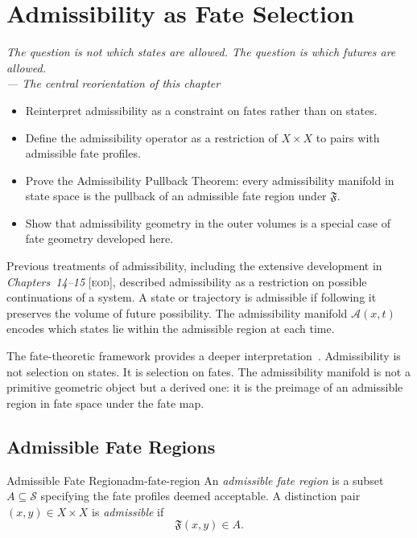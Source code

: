 \documentclass[12pt,twoside,openright]{book}
\newcommand{\adm}{\mathcal{A}}            %
\newcommand{\distPairs}{X\times X}
\newcommand{\fateMap}{\mathfrak{F}}
\newcommand{\fateSpace}{\mathcal{S}}
\newcommand{\EOD}[1]{\textit{#1} [\textsc{eod}]}
\newcommand{\admRegion}{A}
\newenvironment{epigraph}[2]{%
  \vspace{1em}\begin{flushright}
  \begin{minipage}{0.72\textwidth}
  \itshape\small #1\\[0.4em]
  \upshape\footnotesize\sffamily\color{DistGray}--- #2
  \end{minipage}\end{flushright}\vspace{1.5em}}{}
\newenvironment{objectives}{%
  \begin{tcolorbox}[colback=DistBlue!5,colframe=DistBlue,
    title={\faCheckCircle\enspace Chapter Objectives},
    fonttitle=\sffamily\bfseries\color{white},
    attach boxed title to top left={yshift=-2mm,xshift=4mm},
    boxed title style={colback=DistBlue},breakable]
  \begin{itemize}[leftmargin=*,nosep]}{%
  \end{itemize}\end{tcolorbox}\vspace{1em}}
\providecommand{\admRegion}{A}
\begin{document}

\chapter{Admissibility as Fate Selection}
\label{ch:admissibility-fate}

\begin{epigraph}{The question is not which states are allowed.
  The question is which futures are allowed.}%
  {The central reorientation of this chapter}
\end{epigraph}

\begin{objectives}
\item Reinterpret admissibility as a constraint on fates rather
  than on states.
\item Define the admissibility operator as a restriction of
  $\distPairs$ to pairs with admissible fate profiles.
\item Prove the Admissibility Pullback Theorem: every
  admissibility manifold in state space is the pullback of an
  admissible fate region under $\fateMap$.
\item Show that admissibility geometry in the outer volumes is a
  special case of fate geometry developed here.
\end{objectives}

Previous treatments of admissibility, including the extensive
development in \EOD{Chapters~14--15}, described admissibility
as a restriction on possible continuations of a system.
A state or trajectory is admissible if following it preserves
the volume of future possibility. The admissibility manifold
$\adm(x,t)$ encodes which states lie within the admissible
region at each time.

The fate-theoretic framework provides a deeper interpretation~\cite{amari2016}.
Admissibility is not selection on states. It is selection on
fates. The admissibility manifold is not a primitive geometric
object but a derived one: it is the preimage of an admissible
region in fate space under the fate map.

\section{Admissible Fate Regions}

\begin{definition}{Admissible Fate Region}{adm-fate-region}
An \emph{admissible fate region} is a subset
$\admRegion\subseteq\fateSpace$ specifying the fate profiles
deemed acceptable. A distinction pair $(x,y)\in\distPairs$
is \emph{admissible} if
\[
  \fateMap(x,y)\in\admRegion.
\]
\end{definition}
\end{document}
